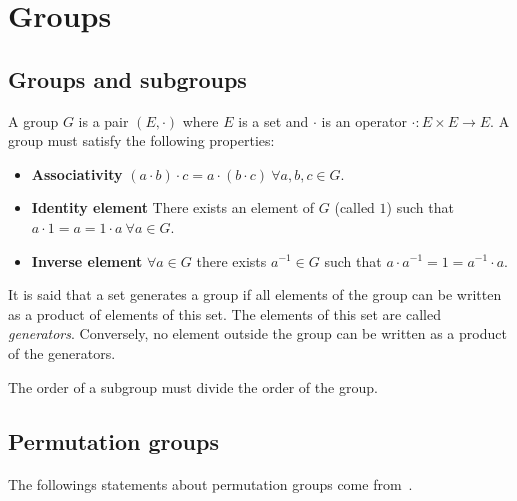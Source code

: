 \section{Groups}

\subsection{Groups and subgroups}

\begin{definition}[Group]
  A group $G$ is a pair $(E, \cdot)$ where $E$ is a set and $\cdot$ is an operator $\cdot: E \times E \to E$. A group must satisfy the following properties:
  \begin{itemize}
    \item \textbf{Associativity} $(a \cdot b) \cdot c = a \cdot (b \cdot c)\ \forall a,b,c \in G$.
    \item \textbf{Identity element} There exists an element of $G$ (called $1$) such that $a \cdot 1 = a = 1 \cdot a \ \forall a \in G$.
    \item \textbf{Inverse element} $\forall a \in G$ there exists $a^{-1} \in G$ such that $a \cdot a^{-1} = 1 = a^{-1} \cdot a$.
  \end{itemize}
\end{definition}

\begin{definition}
  It is said that a set generates a group if all elements of the group can be written as a product of elements of this set. The elements of this set are called \textit{generators}. Conversely, no element outside the group can be written as a product of the generators.
\end{definition}

\begin{property}
  \label{magic-formula}
  The order of a subgroup must divide the order of the group.
\end{property}

\subsection{Permutation groups}

\paragraph{}
The followings statements about permutation groups come from~\cite{cameronPermutationGroups}.

